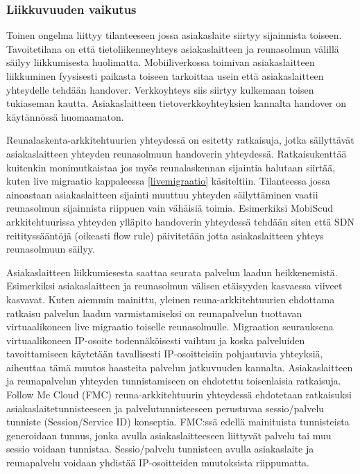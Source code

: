 \subsubsection*{Liikkuvuuden vaikutus}

Toinen ongelma liittyy tilanteeseen jossa asiakaslaite siirtyy sijainnista toiseen. Tavoitetilana on että tietoliikenneyhteys asiakaslaitteen ja reunasolmun välillä säilyy liikkumisesta huolimatta.  
Mobiiliverkossa toimivan asiakaslaitteen liikkuminen fyysisesti paikasta toiseen tarkoittaa usein että asiakaslaitteen yhteydelle tehdään handover.
Verkkoyhteys siis siirtyy kulkemaan toisen tukiaseman kautta. 
Asiakaslaitteen tietoverkkoyhteyksien kannalta handover on käytännössä huomaamaton.

Reunalaskenta-arkkitehtuurien yhteydessä on esitetty ratkaisuja, jotka säilyttävät asiakaslaitteen yhteyden reunasolmuun handoverin yhteydessä. Ratkaisukenttää kuitenkin monimutkaistaa jos myös reunalaskennan sijaintia halutaan siirtää, kuten live migraatio kappaleessa \ref{livemigraatio} käsiteltiin.
Tilanteessa jossa ainoastaan asiakaslaitteen sijainti muuttuu yhteyden säilyttäminen vaatii reunasolmun sijainnista riippuen vain vähäisiä toimia. Esimerkiksi MobiScud arkkitehtuurissa yhteyden ylläpito handoverin yhteydessä tehdään siten että SDN reitityssääntöjä (oikeasti flow rule) päivitetään jotta asiakaslaitteen yhteys reunasolmuun säilyy. 

Asiakaslaitteen liikkumiesesta saattaa seurata palvelun laadun heikkenemistä. Esimerkiksi asiakaslaitteen ja reunasolmun välisen etäisyyden kasvaessa viiveet kasvavat.
Kuten aiemmin mainittu, yleinen reuna-arkkitehtuurien ehdottama ratkaisu palvelun laadun varmistamiseksi on reunapalvelun tuottavan virtuaalikoneen live migraatio toiselle reunasolmulle.
Migraation seurauksena virtuaalikoneen IP-osoite todennäköisesti vaihtuu ja koska palveluiden tavoittamiseen käytetään tavallisesti IP-osoitteisiin pohjautuvia yhteyksiä, aiheuttaa tämä muutos haasteita palvelun jatkuvuuden kannalta.
Asiakaslaitteen ja reunapalvelun yhteyden tunnistamiseen on ehdotettu toisenlaisia ratkaisuja.
Follow Me Cloud (FMC) \cite{taleb2013follow} reuna-arkkitehtuurin yhteydessä ehdotetaan ratkaisuksi asiakaslaitetunnisteeseen ja palvelutunnisteeseen perustuvaa sessio/palvelu tunniste (Session/Service ID) konseptia.
FMC:ssä edellä mainituista tunnisteista generoidaan tunnus, jonka avulla asiakaslaitteeseen liittyvät palvelu tai muu sessio voidaan tunnistaa.
Sessio/palvelu tunnisteen avulla asiakaslaite ja reunapalvelu voidaan yhdistää IP-osoitteiden muutoksista riippumatta.

